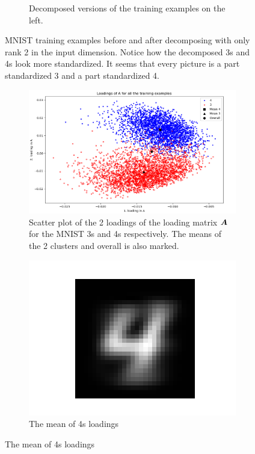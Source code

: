 \begin{figure}
\begin{subfigure}{0.45\linewidth}
        \captionsetup{width=.8\linewidth}
        \caption{Decomposed versions of the training examples on the left.}
    \end{subfigure}
    \captionsetup{width=.95\linewidth}
    \caption{MNIST training examples before and after decomposing with only rank 2 in the input dimension. Notice how the decomposed 3s and 4s look more standardized. It seems that every picture is a part standardized 3 and a part standardized 4. }
    \label{fig:decompExample3_4}
\end{figure}

\begin{figure}
    \centering
    \begin{subfigure}{0.99\linewidth}
        \includegraphics[width=\linewidth]{Pics/06_results/LoadingsOfAScatterMNIST.png}
        \caption{Scatter plot of the 2 loadings of the loading matrix $\boldsymbol{A}$ for the MNIST 3s and 4s respectively. The means of the 2 clusters and overall is also marked.}
        \label{fig:loadingAMatrix}
    \end{subfigure}
    \begin{subfigure}{0.3\linewidth}
    \centering
        \includegraphics[width=.5\linewidth]{Pics/06_results/general4.png}
        \caption{The mean of 4s loadings}
    \end{subfigure}

\end{figure}
